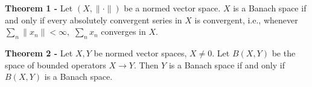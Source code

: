 \documentclass[12pt]{article}
\begin{document}
{\bf Theorem 1 -} Let $(X,\| \cdot \|)$ be a normed vector space. $X$ is a Banach space if and only if  every absolutely
 convergent series in $X$ is convergent, i.e., whenever $\sum_n \|x_n\| < \infty,$ $\sum_n x_n$ converges in $X$.

{\bf Theorem 2 -} Let $X, Y$ be normed vector spaces, $X \ne 0$. Let $B(X,Y)$ be the space of bounded operators $X \longrightarrow Y$. Then
 $Y$ is a Banach space if and only if $B(X,Y)$ is a Banach space.
\end{document}
